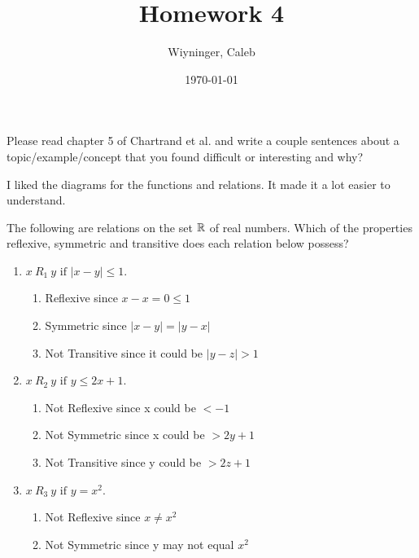 \documentclass{homework}
\author{Wiyninger, Caleb}  %
\date{\today}  %
\title{Homework 4}
\begin{document}
 \maketitle

\question Please read chapter 5 of Chartrand et al. and write a couple sentences about a topic/example/concept that you found difficult or interesting and why?

\begin{sol}
  I liked the diagrams for the functions and relations. It made it a lot easier to understand. 
\end{sol}

\question The following are relations on the set $\mathbb{R}$ of real numbers. Which of the properties reflexive, symmetric and transitive does each relation below possess?
\begin{enumerate}[label=(\alph*)]
	\item $x \ R_1 \ y \text{ if } |x - y| \leq 1$.
        \begin{sol}
            \begin{enumerate}
                \item Reflexive since $x-x=0\leq1$
                \item Symmetric since $|x-y|=|y-x|$
                \item Not Transitive since it could be $|y-z|>1$
            \end{enumerate}
        \end{sol}
	\item $x \ R_2 \ y \text{ if } y \leq 2x + 1$.
        \begin{sol}
            \begin{enumerate}
              \item Not Reflexive since x could be $< -1$
              \item Not Symmetric since x could be $> 2y+1$
              \item Not Transitive since y could be $> 2z+1$
            \end{enumerate}
        \end{sol}
	\item $x \ R_3 \ y \text{ if } y = x^2$.
        \begin{sol}
            \begin{enumerate}
              \item Not Reflexive since $x\neq x^2$
              \item Not Symmetric since y may not equal $x^2$

\end{enumerate}
\end{sol}
\end{enumerate}
\end{document}
